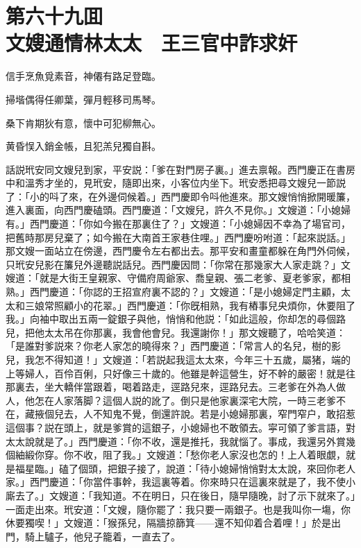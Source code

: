 
\chapter*{第六十九囬　\\文嫂通情林太太　王三官中詐求奸}


\begin{myquote}
信手烹魚覓素音，神僊有路足登臨。

掃堦偶得任卿葉，彈月輕移司馬琴。

桑下肯期狄有意，懷中可犯柳無心。

黄昏悮入銷金帳，且犯羔兒獨自斟。
\end{myquote}

話説玳安同文嫂兒到家，平安説：「爹在對門房子裏。」進去禀報。西門慶正在書房中和溫秀才坐的，見玳安，隨即出來，小客位内坐下。玳安悉把尋文嫂兒一節説了：「小的呌了來，在外邊伺候着。」西門慶即令呌他進來。那文嫂悄悄掀開暖簾，進入裏面，向西門慶磕頭。西門慶道：「文嫂兒，許久不見你。」文嫂道：「小媳婦有。」西門慶道：「你如今搬在那裏住了？」文嫂道：「小媳婦因不幸為了場官司，把舊時那房兒棄了；如今搬在大南首王家巷住哩。」西門慶吩咐道：「起來説話。」那文嫂一面站立在傍邊，西門慶令左右都出去。那平安和畫童都躲在角門外伺候，只玳安兒影在簾兒外邊聽説話兒。西門慶因問：「你常在那幾家大人家走跳？」文嫂道：「就是大街王皇親家、守備府周爺家、喬皇親、張二老爹、夏老爹家，都相熟。」西門慶道：「你認的王招宣府裏不認的？」文嫂道：「是小媳婦定門主顧，太太和三娘常照顧小的花翠。」西門慶道：「你旣相熟，我有樁事兒央煩你，休要阻了我。」向袖中取出五兩一錠銀子與他，悄悄和他説：「如此這般，你却怎的尋個路兒，把他太太吊在你那裏，我會他會兒。我還謝你！」那文嫂聽了，哈哈笑道：「是誰對爹説來？你老人家怎的曉得來？」西門慶道：「常言人的名兒，樹的影兒，我怎不得知道！」文嫂道：「若説起我這太太來，今年三十五歲，屬猪，端的上等婦人，百伶百俐，只好像三十歲的。他雖是幹這營生，好不幹的嚴密！就是往那裏去，坐大轎伴當跟着，喝着路走，逕路兒來，逕路兒去。三老爹在外為人做人，他怎在人家落脚？這個人説的訛了。倒只是他家裏深宅大院，一時三老爹不在，藏掖個兒去，人不知鬼不覺，倒還許說。若是小媳婦那裏，窄門窄户，敢招惹這個事？説在頭上，就是爹賞的這銀子，小媳婦也不敢領去。寜可領了爹言語，對太太說就是了。」西門慶道：「你不收，還是推托，我就惱了。事成，我還另外賞幾個紬緞你穿。你不收，阻了我。」文嫂道：「愁你老人家沒也怎的！上人着眼覷，就是福星臨。」磕了個頭，把銀子接了，說道：「待小媳婦悄悄對太太說，來回你老人家。」西門慶道：「你當件事幹，我這裏等着。你來時只在這裏來就是了，我不使小廝去了。」文嫂道：「我知道。不在明日，只在後日，隨早隨晚，討了示下就來了。」一面走出來。玳安道：「文嫂，隨你罷了：我只要一兩銀子。也是我叫你一塲，你休要獨喫！」文嫂道：「猴孫兒，隔牆掠篩箕——還不知仰着合着哩！」於是出門，騎上驢子，他兒子籠着，一直去了。

